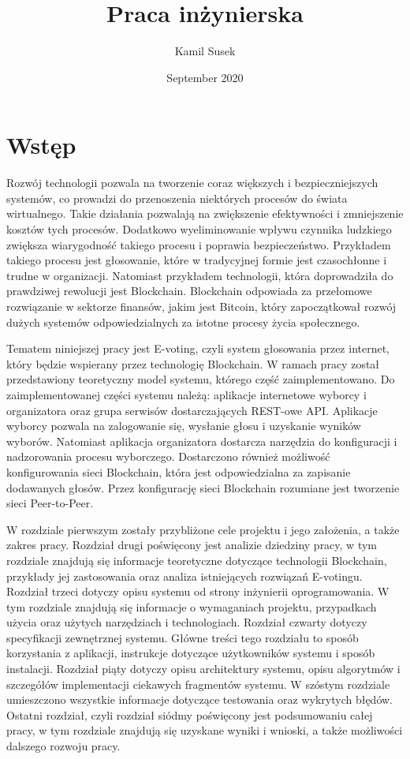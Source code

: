 \documentclass[a4paper,12pt]{book}
\begin{document}
\begin{titlepage}

\title{Praca inżynierska}
\author{Kamil Susek}
\date{September 2020}

\maketitle
\end{titlepage}
\chapter{Wstęp}

Rozwój technologii pozwala na tworzenie coraz większych i bezpieczniejszych systemów, co prowadzi do przenoszenia niektórych procesów do świata wirtualnego. Takie działania pozwalają na zwiększenie efektywności i zmniejszenie kosztów tych procesów. Dodatkowo wyeliminowanie wpływu czynnika ludzkiego zwiększa wiarygodność takiego procesu i poprawia bezpieczeństwo. Przykładem takiego procesu jest głosowanie, które w tradycyjnej formie jest czasochłonne i trudne w organizacji. Natomiast przykładem technologii, która doprowadziła do prawdziwej rewolucji jest Blockchain. Blockchain odpowiada za przełomowe rozwiązanie w sektorze finansów, jakim jest Bitcoin, który zapoczątkował rozwój dużych systemów odpowiedzialnych za istotne procesy życia społecznego.

Tematem niniejszej pracy jest E-voting, czyli system głosowania przez internet, który będzie wspierany przez technologię Blockchain. W ramach pracy został przedstawiony teoretyczny model systemu, którego część zaimplementowano. Do zaimplementowanej części systemu należą: aplikacje internetowe wyborcy i organizatora oraz grupa serwisów dostarczających REST-owe API. Aplikacje wyborcy pozwala na zalogowanie się, wysłanie głosu i uzyskanie wyników wyborów. Natomiast aplikacja organizatora dostarcza narzędzia do konfiguracji i nadzorowania procesu wyborczego. Dostarczono również możliwość konfigurowania sieci Blockchain, która jest odpowiedzialna za zapisanie dodawanych głosów. Przez konfigurację sieci Blockchain rozumiane jest tworzenie sieci Peer-to-Peer.

W rozdziale pierwszym zostały przybliżone cele projektu i jego założenia, a także zakres pracy. Rozdział drugi poświęcony jest analizie dziedziny pracy, w tym rozdziale znajdują się informacje teoretyczne dotyczące technologii Blockchain, przykłady jej zastosowania oraz analiza istniejących rozwiązań E-votingu. Rozdział trzeci dotyczy opisu systemu od strony inżynierii oprogramowania. W tym rozdziale znajdują się informacje o wymaganiach projektu, przypadkach użycia oraz użytych narzędziach i technologiach. Rozdział czwarty dotyczy specyfikacji zewnętrznej systemu. Główne treści tego rozdziału to sposób korzystania z aplikacji, instrukcje dotyczące użytkowników systemu i sposób instalacji. Rozdział piąty dotyczy opisu architektury systemu, opisu algorytmów i szczegółów implementacji ciekawych fragmentów systemu. W szóstym rozdziale umieszczono wszystkie informacje dotyczące testowania oraz wykrytych błędów.
Ostatni rozdział, czyli rozdział siódmy poświęcony jest podsumowaniu całej pracy, w tym rozdziale znajdują się uzyskane wyniki i wnioski, a także możliwości dalszego rozwoju pracy.
\end{document}
